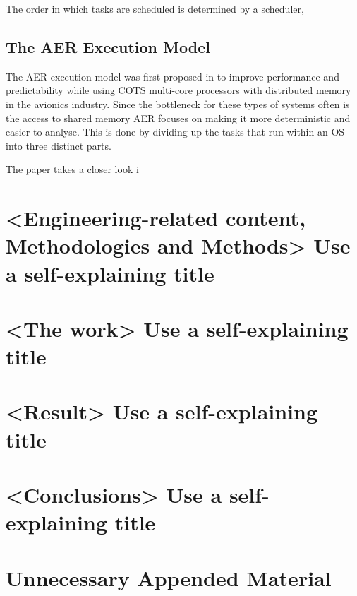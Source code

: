 \documentclass{kththesis}
\begin{document}
The order in which tasks are scheduled is determined by a scheduler,

\section{The AER Execution Model}

The AER  execution model was first proposed in
\parencite{durrieu_predictable_2014} to improve performance and predictability while using COTS
 multi-core processors with distributed memory in the
avionics industry. Since the bottleneck for these types of systems often is the access to shared
memory AER focuses on making it more deterministic and easier to analyse. This is done by dividing
up the tasks that run within an OS into three distinct parts.


The paper \parencite{maia_closer_2016} takes a closer look i


\chapter{<Engineering-related content, Methodologies and Methods> Use a self-explaining title}


\chapter{<The work> Use a self-explaining title}


\chapter{<Result> Use a self-explaining title}


\chapter{<Conclusions> Use a self-explaining title}


\printbibliography[heading=bibintoc] %


\appendix

\chapter{Unnecessary Appended Material}
\end{document}
